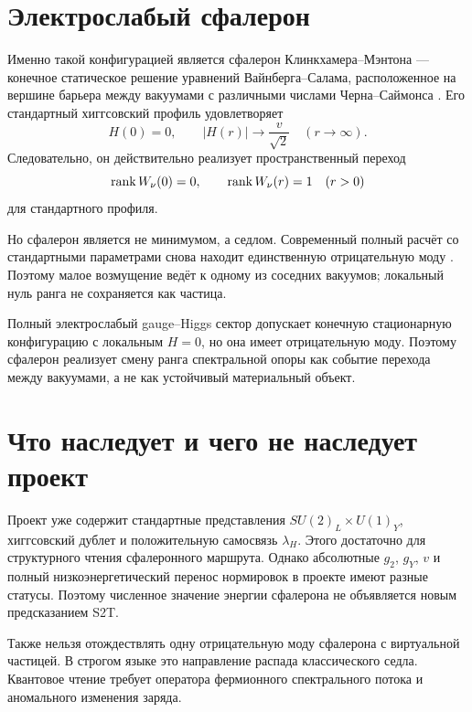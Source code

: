 \section{Электрослабый сфалерон}

Именно такой конфигурацией является сфалерон Клинкхамера--Мэнтона ---
конечное статическое решение уравнений Вайнберга--Салама, расположенное на
вершине барьера между вакуумами с различными числами Черна--Саймонса
\cite{higgs-saddle-klinkhamer-manton1984}. Его стандартный хиггсовский
профиль удовлетворяет
\begin{equation}
 H(0)=0,
 \qquad |H(r)|\longrightarrow\frac{v}{\sqrt2}
 \quad(r\to\infty).
\end{equation}
Следовательно, он действительно реализует пространственный переход
\begin{equation}
 \operatorname{rank} W_\nu(0)=0,
 \qquad
 \operatorname{rank} W_\nu(r)=1\quad(r>0)
\end{equation}
для стандартного профиля.

Но сфалерон является не минимумом, а седлом. Современный полный расчёт со
стандартными параметрами снова находит единственную отрицательную моду
\cite{higgs-saddle-matchev-verner2025}. Поэтому малое возмущение ведёт к
одному из соседних вакуумов; локальный нуль ранга не сохраняется как
частица.

\begin{proposition}
Полный электрослабый gauge--Higgs сектор допускает конечную стационарную
конфигурацию с локальным $H=0$, но она имеет отрицательную моду. Поэтому
сфалерон реализует смену ранга спектральной опоры как событие перехода
между вакуумами, а не как устойчивый материальный объект.
\end{proposition}

\section{Что наследует и чего не наследует проект}

Проект уже содержит стандартные представления
$SU(2)_L\times U(1)_Y$, хиггсовский дублет и положительную
самосвязь $\lambda_H$. Этого достаточно для структурного чтения
сфалеронного маршрута. Однако абсолютные $g_2$, $g_Y$, $v$ и полный
низкоэнергетический перенос нормировок в проекте имеют разные статусы.
Поэтому численное значение энергии сфалерона не объявляется новым
предсказанием S2T.

Также нельзя отождествлять одну отрицательную моду сфалерона с виртуальной
частицей. В строгом языке это направление распада классического седла.
Квантовое чтение требует оператора фермионного спектрального потока и
аномального изменения заряда.


